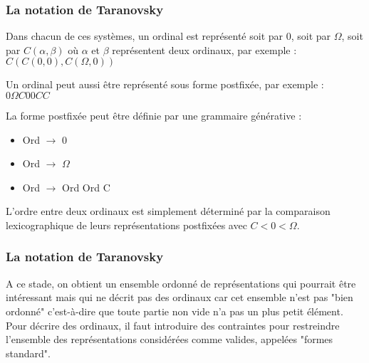 \documentclass[12pt]{beamer}
\begin{document}
\begin{frame}
\frametitle{La notation de Taranovsky}

Dans chacun de ces systèmes, un ordinal est représenté soit par 0, soit par $\Omega$, soit par \( C(\alpha,\beta) \) où $\alpha$ et $\beta$ représentent deux ordinaux, par exemple : \( C(C(0,0),C(\Omega,0)) \)

Un ordinal peut aussi être représenté sous forme postfixée, par exemple : \( 0 \Omega C 0 0 C C \)

La forme postfixée peut être définie par une grammaire générative : 

\begin{itemize}
     \setlength{\itemsep}{1pt}
     \setlength{\parskip}{0pt}
     \setlength{\parsep}{0pt}
\item Ord $\rightarrow$ 0
\item Ord $\rightarrow$ $\Omega$
\item Ord $\rightarrow$ Ord Ord C
\end{itemize}

L'ordre entre deux ordinaux est simplement déterminé par la comparaison lexicographique de leurs représentations postfixées avec \( C < 0 < \Omega \).

\end{frame}
\begin{frame}
\frametitle{La notation de Taranovsky}

A ce stade, on obtient un ensemble ordonné de représentations qui pourrait être intéressant mais qui ne décrit pas des ordinaux car cet ensemble n'est pas "bien ordonné" c'est-à-dire que toute partie non vide n'a pas un plus petit élément. Pour décrire des ordinaux, il faut introduire des contraintes pour restreindre l'ensemble des représentations considérées comme valides, appelées "formes standard".

\end{frame}
\end{document}
